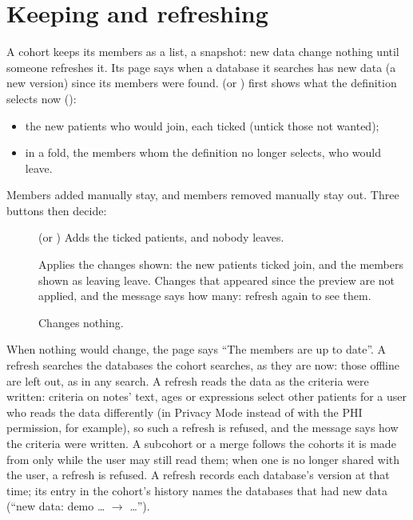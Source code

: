 \section{Keeping and refreshing}
\label{sec:cohorts-refresh}

A cohort keeps its members as a list, a snapshot: new data change nothing until someone
refreshes it. Its page says when a database it searches has new data (a new version) since its
members were found.
 (or ) first shows what the definition
selects now ():
\begin{itemize}
\item the new patients who would join, each ticked (untick those not wanted);
\item in a fold, the members whom the definition no longer selects, who would leave.
\end{itemize}
Members added manually stay, and members removed manually stay out. Three buttons then decide:
\begin{description}
\item[] (or ) Adds the
  ticked patients, and nobody leaves.
\item[] Applies the changes shown: the new
  patients ticked join, and the members shown as leaving leave. Changes that appeared since the
  preview are not applied, and the message says how many: refresh again to see them.
\item[] Changes nothing.
\end{description}
When nothing would change, the page says ``The members are up to date''. A refresh searches the
databases the cohort searches, as they are now: those offline are left out, as in any search. A
refresh reads the data as the criteria were written: criteria on notes' text, ages or expressions
select other
patients for a user who reads the data differently (in Privacy Mode instead of with the PHI
permission, for example), so such a refresh is refused, and the message says how the criteria
were written. A subcohort or a merge follows the cohorts it is made from only while the user may
still read them; when one is no longer shared with the user, a refresh is refused. A refresh records each
database's version at that time; its entry in the cohort's history names the databases that had
new data (``new data: demo \dots{} $\rightarrow$ \dots'').

